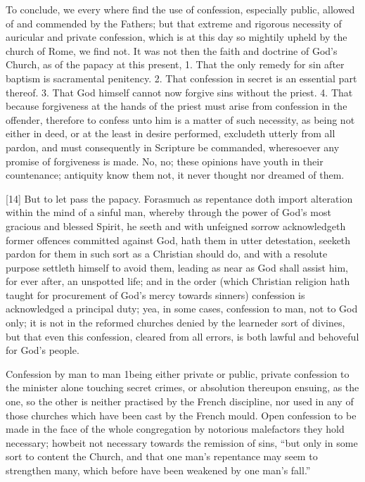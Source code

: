 To conclude, we every where find the use of confession, especially public, allowed of and commended by the Fathers; but that extreme and rigorous necessity of auricular and private confession, which is at this day so mightily upheld by the church of Rome, we find not. It was not then the faith and doctrine of God’s Church, as of the papacy at this present, 1. That the only remedy for sin after baptism is sacramental penitency. 2. That confession in secret is an essential part thereof. 3. That God himself cannot now forgive sins without the priest. 4. That because forgiveness at the hands of the priest must arise from confession in the offender, therefore to confess unto him is a matter of such necessity, as being not either in deed, or at the least in desire performed, excludeth utterly from all pardon, and must consequently in Scripture be commanded, wheresoever any promise of forgiveness is made. No, no; these opinions have youth in their countenance; antiquity know them not, it never thought nor dreamed of them.

[14] But to let pass the papacy. Forasmuch as repentance doth import alteration within the mind of a sinful man, whereby through the power of God’s most gracious and blessed Spirit, he seeth and with unfeigned sorrow acknowledgeth former offences committed against God, hath them in utter detestation, seeketh pardon for them in such sort as a Christian should do, and with a resolute purpose settleth himself to avoid them, leading as near as God shall assist him, for ever after, an unspotted life; and in the order (which Christian religion hath taught for procurement of God’s mercy towards sinners) confession is acknowledged a principal duty; yea, in some cases, confession to man, not to God only; it is not in the reformed churches denied by the learneder sort of divines, but that even this confession, cleared from all errors, is both lawful and behoveful for God’s people.


Confession by man to man 1being either private or public, private confession to the minister alone touching secret crimes, or absolution thereupon ensuing, as the one, so the other is neither practised by the French discipline, nor used in any of those churches which have been cast by the French mould. Open confession to be made in the face of the whole congregation by notorious malefactors they hold necessary; howbeit not necessary towards the remission of sins, “but only in some sort to content the Church, and that one man’s repentance may seem to strengthen many, which before have been weakened by one man’s fall.”

